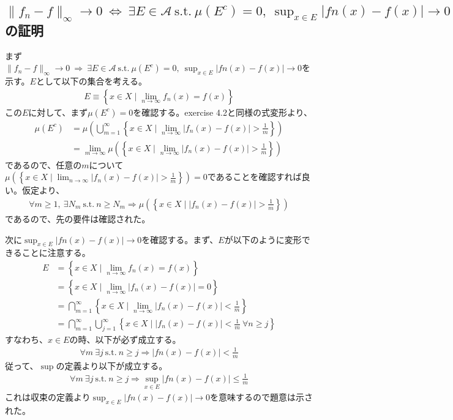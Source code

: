 \documentclass{article}
\begin{document}
\subsection{$\| f_n -f \|_{\infty} \to 0\ \Leftrightarrow\ \exists E\in \mathcal{A}\ \text{s.t.}\ \mu(E^c) = 0,\ \sup_{x\in E} |fn(x) - f(x)| \to 0$の証明}
まず$\| f_n -f \|_{\infty} \to 0\ \Rightarrow\ \exists E\in \mathcal{A}\ \text{s.t.}\ \mu(E^c) = 0,\ \sup_{x\in E} |fn(x) - f(x)| \to 0$を示す。$E$として以下の集合を考える。
\begin{align*}
	E \equiv \left\{ x\in X \mid \lim_{n \to \infty} f_n(x) = f(x) \right\}
\end{align*}
この$E$に対して、まず$\mu(E^c) = 0$を確認する。exercise 4.2と同様の式変形より、
\begin{align*}
	\mu(E^c) &= \mu\left( \bigcup_{m = 1}^{\infty} \left\{ x\in X \mid \lim_{n\to \infty} |f_n(x) - f(x)| > \frac{1}{m} \right\} \right)\\
	&= \lim_{m \to \infty} \mu \left( \left\{ x\in X \mid \lim_{n\to \infty} |f_n(x) - f(x)| > \frac{1}{m} \right\} \right)
\end{align*}
であるので、任意の$m$について$\mu \left( \left\{ x\in X \mid \lim_{n\to \infty} |f_n(x) - f(x)| > \frac{1}{m} \right\} \right) = 0$であることを確認すれば良い。仮定より、
\begin{align*}
	\forall m \geq 1,\ \exists N_m\ \text{s.t.}\ n \geq N_m \Rightarrow \mu\left( \left\{ x\in X \mid |f_n(x) - f(x)| > \frac{1}{m} \right\} \right)
\end{align*}
であるので、先の要件は確認された。

次に$\sup_{x\in E} |fn(x) - f(x)| \to 0$を確認する。まず、$E$が以下のように変形できることに注意する。
\begin{align*}
	E &= \left\{ x\in X \mid \lim_{n \to \infty} f_n(x) = f(x) \right\}\\
	&= \left\{ x\in X \mid \lim_{n \to \infty} |f_n(x)-f(x)| = 0 \right\}\\
	&= \bigcap_{m = 1}^{\infty} \left\{ x\in X \mid \lim_{n \to \infty} |f_n(x)-f(x)| < \frac{1}{m} \right\}\\
	&= \bigcap_{m = 1}^{\infty} \bigcup_{j = 1}^{\infty} \left\{ x\in X \mid |f_n(x)-f(x)| < \frac{1}{m}\ \forall n \geq j \right\}
\end{align*}
すなわち、$x\in E$の時、以下が必ず成立する。
\begin{align*}
	\forall m\ \exists j \ \text{s.t.}\ n \geq j \Rightarrow |fn(x) - f(x) | < \frac{1}{m}
\end{align*}
従って、$\sup$の定義より以下が成立する。
\begin{align*}
	\forall m\ \exists j \ \text{s.t.}\ n \geq j \Rightarrow \sup_{x \in E} |fn(x) - f(x) | \leq \frac{1}{m}
\end{align*}
これは収束の定義より$\sup_{x\in E} |fn(x) - f(x)| \to 0$を意味するので題意は示された。
\end{document}
